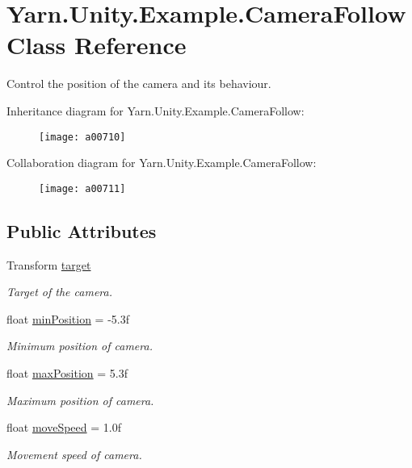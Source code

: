\hypertarget{a00047}{\section{Yarn.\-Unity.\-Example.\-Camera\-Follow Class Reference}
\label{a00047}
}


Control the position of the camera and its behaviour.  




Inheritance diagram for Yarn.\-Unity.\-Example.\-Camera\-Follow\-:
\nopagebreak
\begin{figure}[H]
\begin{center}
\leavevmode
\texttt{[image: a00710]}
\end{center}
\end{figure}


Collaboration diagram for Yarn.\-Unity.\-Example.\-Camera\-Follow\-:
\nopagebreak
\begin{figure}[H]
\begin{center}
\leavevmode
\texttt{[image: a00711]}
\end{center}
\end{figure}
\subsection*{Public Attributes}
\begin{DoxyCompactItemize}
\item 
Transform \hyperlink{a00047_aa5d6958fb14a14ebb74e21c372fcca8b}{target}
\begin{DoxyCompactList}\small\item\em Target of the camera. \end{DoxyCompactList}\item 
float \hyperlink{a00047_a08c6f6c0ea423c21af99e4b5467d3c9b}{min\-Position} = -\/5.\-3f
\begin{DoxyCompactList}\small\item\em Minimum position of camera. \end{DoxyCompactList}\item 
float \hyperlink{a00047_abb0154dcbc2a7d43795beacd61a56de4}{max\-Position} = 5.\-3f
\begin{DoxyCompactList}\small\item\em Maximum position of camera. \end{DoxyCompactList}\item 
float \hyperlink{a00047_a3d4f2efe9c2cee8c7ff797cac03f27ec}{move\-Speed} = 1.\-0f
\begin{DoxyCompactList}\small\item\em Movement speed of camera. \end{DoxyCompactList}\end{DoxyCompactItemize}
